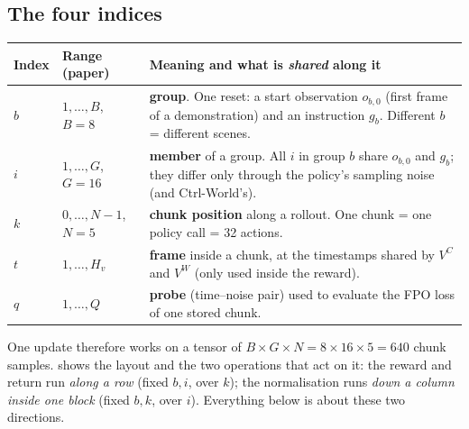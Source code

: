 \documentclass[11pt,a4paper]{article}
\newcommand{\VC}{V^{C}}
\newcommand{\VW}{V^{W}}
\theoremstyle{remark}
\begin{document}
\subsection{The four indices}
\begin{center}
\small
\begin{tabularx}{\linewidth}{@{}l l Y@{}}
\toprule
Index & Range (paper) & Meaning and what is \emph{shared} along it\\
\midrule
$b$ & $1,\dots,B$, $B=8$ & \textbf{group}. One reset: a start observation $o_{b,0}$ (first frame of a demonstration) and an instruction $g_b$. Different $b$ = different scenes.\\
$i$ & $1,\dots,G$, $G=16$ & \textbf{member} of a group. All $i$ in group $b$ share $o_{b,0}$ and $g_b$; they differ only through the policy's sampling noise (and Ctrl-World's).\\
$k$ & $0,\dots,N-1$, $N=5$ & \textbf{chunk position} along a rollout. One chunk = one policy call = 32 actions.\\
$t$ & $1,\dots,H_v$ & \textbf{frame} inside a chunk, at the timestamps shared by $\VC$ and $\VW$ (only used inside the reward).\\
$q$ & $1,\dots,Q$ & \textbf{probe} (time--noise pair) used to evaluate the FPO loss of one stored chunk.\\
\bottomrule
\end{tabularx}
\end{center}

One update therefore works on a tensor of $B\times G\times N=8\times16\times5=640$ chunk samples.  shows the layout and the two operations that act on it: the reward and return run \emph{along a row} (fixed $b,i$, over $k$); the normalisation runs \emph{down a column inside one block} (fixed $b,k$, over $i$). Everything below is about these two directions.
\end{document}
